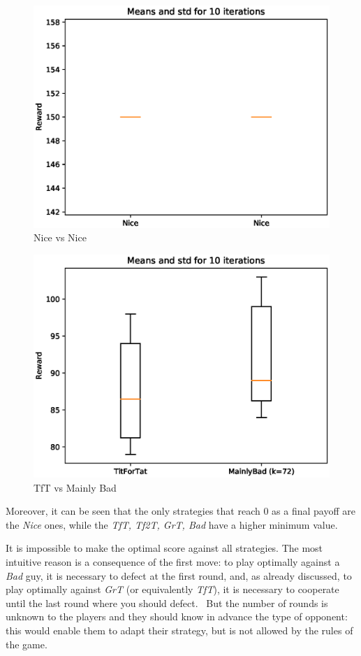 \documentclass[journal,10pt,twoside]{IEEEtran}
\begin{document}
\begin{figure}[!ht]
    \centering
    \includegraphics[width=.7\columnwidth]{../img/ipd2p/ipd2p-boxplot-Nice-Nice}
    \caption{Nice vs Nice}
    \label{fig:boxnn}
\end{figure}

\begin{figure}[!ht]
    \centering
    \includegraphics[width=.7\columnwidth]{../img/ipd2p/ipd2p-boxplot-TitForTat-MainlyBad(k=72)}
    \caption{TfT vs Mainly Bad}
    \label{fig:boxmbvtft}
\end{figure}

Moreover, it can be seen that the only strategies that reach $0$ as a final payoff are the \textit{Nice} ones, while the \textit{TfT, Tf2T, GrT, Bad} have a higher minimum value.

It is impossible to make the optimal score against all strategies. The most intuitive reason is a consequence of the first move: to play optimally against a \textit{Bad} guy, it is necessary to defect at the first round, and, as already discussed, to play optimally against \textit{GrT} (or equivalently \textit{TfT}), it is necessary to cooperate until the last round where you should defect.~\cite{mathieu2017}
But the number of rounds is unknown to the players and they should know in advance the type of opponent: this would enable them to adapt their strategy, but is not allowed by the rules of the game. 
\end{document}
